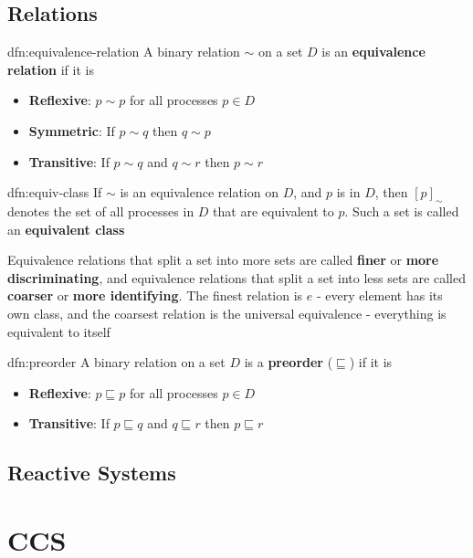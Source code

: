 \documentclass{article}
\begin{document}
\newpage

\subsection{Relations}

\begin{dfn}{dfn:equivalence-relation}{}
    A binary relation $\sim$ on a set $D$ is an \textbf{equivalence relation} if it is
    \begin{itemize}
        \item \textbf{Reflexive}: $p \sim p$ for all processes $p\in D$
        \item \textbf{Symmetric}: If $p \sim q$ then $q \sim p$
        \item \textbf{Transitive}: If $p \sim q$ and $q \sim r$ then $p \sim r$
    \end{itemize}
\end{dfn}

\begin{dfn}{dfn:equiv-class}{}
    If $\sim$ is an equivalence relation on $D$, and $p$ is in $D$, then $[p]_{\sim}$ denotes the set of all processes in $D$ that are equivalent to $p$. Such a set is called an \textbf{equivalent class}

    \longrule{0.08ex}

    Equivalence relations that split a set into more sets are called \textbf{finer} or \textbf{more discriminating}, and equivalence relations that split a set into less sets are called \textbf{coarser} or \textbf{more identifying}. The finest relation is $e$ - every element has its own class, and the coarsest relation is the universal equivalence - everything is equivalent to itself
\end{dfn}

\begin{dfn}{dfn:preorder}{}
    A binary relation on a set $D$ is a \textbf{preorder} ($\sqsubseteq$) if it is
    \begin{itemize}
        \item \textbf{Reflexive}: $p \sqsubseteq p$ for all processes $p\in D$
        \item \textbf{Transitive}: If $p \sqsubseteq q$ and $q \sqsubseteq r$ then $p \sqsubseteq r$
    \end{itemize}
\end{dfn}

\subsection{Reactive Systems}

\newpage
\section{CCS}
\end{document}
